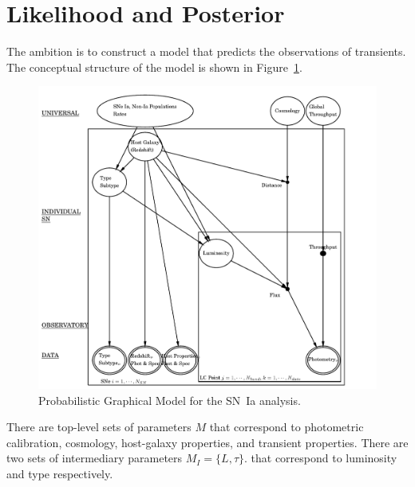 \documentclass[preprint,3p]{elsarticle}
\begin{document}
%
%

\section{Likelihood and Posterior}
\label{likelihood:sec}

The ambition is to construct a model that predicts the observations of
transients.
The conceptual structure of the model is shown in Figure~\ref{pgm:fig}. 
\begin{figure}[htbp] %
   \centering
   \includegraphics[width=6.5in]{../results//hdpgm.pdf} 
   \caption{Probabilistic Graphical Model for the SN~Ia analysis.  
   \label{pgm:fig}}
\end{figure}

There are top-level  sets of parameters $M$ that correspond to photometric calibration, cosmology,
host-galaxy properties, and transient properties.
There are two sets of intermediary parameters  $M_I=\{L, \tau\}$. that correspond to luminosity and type respectively.
\end{document}
